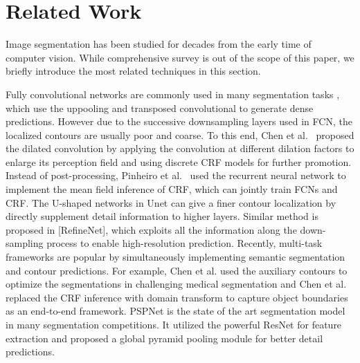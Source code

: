 \section{Related Work}
%
Image segmentation has been studied for decades from the early time of computer vision. While comprehensive survey is out of the scope of this paper, we briefly introduce the most related techniques in this section.

Fully convolutional networks are commonly used in many segmentation tasks \cite{Long2015,Badrinarayanan2015,Noh2015,Ronneberger2015,Chen2016a,Chen2017,Zhao2016}, which use the uppooling \cite{Badrinarayanan2015} and transposed convolutional \cite{Noh2015} to generate dense predictions.
However due to the successive downsampling layers used in FCN, the localized contours are usually poor and coarse.
To this end, Chen et al.~\cite{Chen2016a} proposed the dilated convolution by applying the convolution at different dilation factors to enlarge its perception field and using discrete CRF models for further promotion.
Instead of post-processing, Pinheiro et al.~\cite{Pinheiro2014} used the recurrent neural network to implement the mean field inference of CRF, which can jointly train FCNs and CRF.
The U-shaped networks in Unet \cite{Badrinarayanan2015} can give a finer contour localization by directly supplement detail information to higher layers.
Similar method is proposed in [RefineNet], which exploits all the information along the down-sampling process to enable high-resolution prediction.
Recently, multi-task frameworks are popular by simultaneously implementing semantic segmentation and contour predictions.
For example,  Chen et al.\cite{Chen2017} used the auxiliary contours to optimize the segmentations in challenging medical segmentation and Chen et al.\cite{Chen2016Semantic} replaced the CRF inference with domain transform to capture object boundaries as an end-to-end framework.
PSPNet \cite{Zhao2016} is the state of the art segmentation model in many segmentation competitions.
It utilized the powerful ResNet \cite{He2016} for feature extraction and proposed a global pyramid pooling module for better detail predictions.

